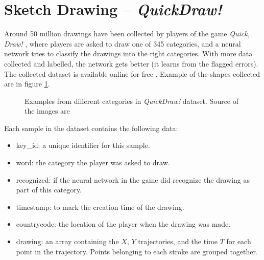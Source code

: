 \section{Sketch Drawing -- \textit{QuickDraw!}}
\par Around 50 million drawings have been collected by players of the game \textit{Quick, Draw!} \citep{quickdrawgame}, where players are asked to draw one of 345 categories, and a neural network tries to classify the drawings into the right categories. With more data collected and labelled, the network gets better (it learns from the flagged errors). The collected dataset is available online for free \citep{quickdraw}. Example of the shapes collected are in figure \ref{fig:quickdraw_preview}.

\begin{figure}
    \centering
    \caption{Examples from different categories in \textit{QuickDraw!} dataset. Source of the images are \citep{quickdraw}}
    \label{fig:quickdraw_preview}
\end{figure}


\par Each sample in the dataset contains the following data:
\begin{itemize}[noitemsep]
    \item key\_id: a unique identifier for this sample.
    \item word: the category the player was asked to draw.
    \item recognized: if the neural network in the game did recognize the drawing as part of this category.
    \item timestamp: to mark the creation time of the drawing.
    \item countrycode: the location of the player when the drawing was made.
    \item drawing: an array containing the $X$, $Y$ trajectories, and the time $T$ for each point in the trajectory. Points belonging to each stroke are grouped together.
\end{itemize}

